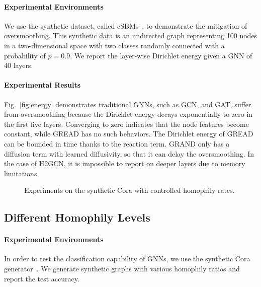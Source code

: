 \documentclass{article}
\theoremstyle{plain}
\theoremstyle{definition}
\theoremstyle{remark}
\begin{document}
\paragraph{Experimental Environments} We use the synthetic dataset, called cSBMs~\cite{Deshpande2018cSBM}, to demonstrate the mitigation of oversmoothing. This synthetic data is an undirected graph representing 100 nodes in a two-dimensional space with two classes randomly connected with a probability of $p=0.9$. We report the layer-wise Dirichlet energy given a GNN of 40 layers.

\paragraph{Experimental Results} Fig.~\ref{fig:energy} demonstrates traditional GNNs, such as GCN, and GAT, suffer from oversmoothing because the Dirichlet energy decays exponentially to zero in the first five layers. Converging to zero indicates that the node features become constant, while GREAD has no such behaviors. The Dirichlet energy of GREAD can be bounded in time thanks to the reaction term. GRAND only has a diffusion term with learned diffusivity, so that it can delay the oversmoothing. In the case of H2GCN, it is impossible to report on deeper layers due to memory limitations.

\begin{figure}[t]
    \centering
    \caption{Experiments on the synthetic Cora with controlled homophily rates.}
\label{fig:syn_cora}
\end{figure}

\subsection{Different Homophily Levels}
\paragraph{Experimental Environments} In order to test the classification capability of GNNs, we use the synthetic Cora generator~\cite{zhu2020h2gcn,li2021deeprobust}. We generate synthetic graphs with various homophily ratios and report the test accuracy.
\end{document}
